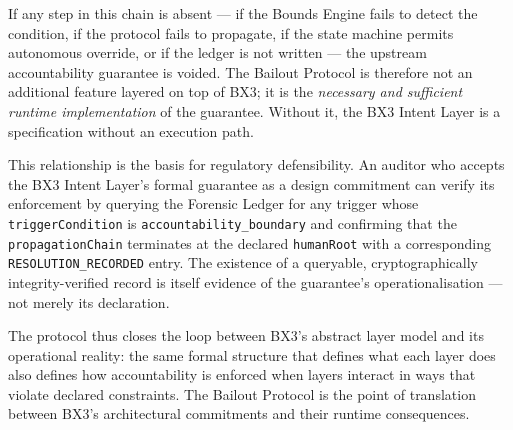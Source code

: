 If any step in this chain is absent — if the Bounds Engine fails to detect the
condition, if the protocol fails to propagate, if the state machine permits
autonomous override, or if the ledger is not written — the upstream accountability
guarantee is voided.  The Bailout Protocol is therefore not an additional feature
layered on top of BX3; it is the \emph{necessary and sufficient runtime
implementation} of the guarantee.  Without it, the BX3 Intent Layer is a
specification without an execution path.

This relationship is the basis for regulatory defensibility.  An auditor who accepts
the BX3 Intent Layer's formal guarantee as a design commitment can verify its
enforcement by querying the Forensic Ledger for any trigger whose
\texttt{triggerCondition} is \texttt{accountability\_boundary} and confirming that
the \texttt{propagationChain} terminates at the declared \texttt{humanRoot} with a
corresponding \texttt{RESOLUTION\_RECORDED} entry.  The existence of a queryable,
cryptographically integrity-verified record is itself evidence of the guarantee's
operationalisation — not merely its declaration.

The protocol thus closes the loop between BX3's abstract layer model and its
operational reality: the same formal structure that defines what each layer does
also defines how accountability is enforced when layers interact in ways that
violate declared constraints.  The Bailout Protocol is the point of translation
between BX3's architectural commitments and their runtime consequences.

